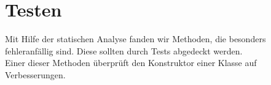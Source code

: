 %
\section{Testen}
Mit Hilfe der statischen Analyse fanden wir Methoden, die besonders fehleranfällig sind. Diese sollten durch Tests abgedeckt werden.\\
Einer dieser Methoden überprüft den Konstruktor einer Klasse auf Verbesserungen. 